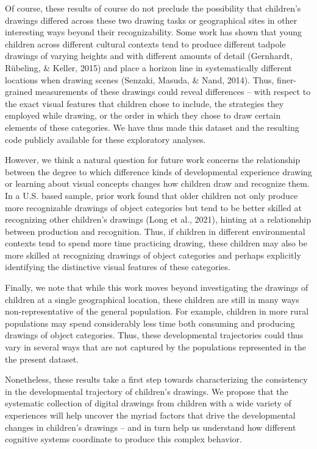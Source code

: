 \documentclass[
  english,
  man]{apa6}
\begin{document}
Of course, these results of course do not preclude the possibility that children's drawings differed across these two drawing tasks or geographical sites in other interesting ways beyond their recognizability. Some work has shown that young children across different cultural contexts tend to produce different tadpole drawings of varying heights and with different amounts of detail (Gernhardt, Rübeling, \& Keller, 2015) and place a horizon line in systematically different locations when drawing scenes (Senzaki, Masuda, \& Nand, 2014). Thus, finer-grained measurements of these drawings could reveal differences -- with respect to the exact visual features that children chose to include, the strategies they employed while drawing, or the order in which they chose to draw certain elements of these categories. We have thus made this dataset and the resulting code publicly available for these exploratory analyses.

However, we think a natural question for future work concerns the relationship between the degree to which difference kinds of developmental experience drawing or learning about visual concepts changes how children draw and recognize them. In a U.S. based sample, prior work found that older children not only produce more recognizable drawings of object categories but tend to be better skilled at recognizing other children's drawings (Long et al., 2021), hinting at a relationship between production and recognition. Thus, if children in different environmental contexts tend to spend more time practicing drawing, these children may also be more skilled at recognizing drawings of object categories and perhaps explicitly identifying the distinctive visual features of these categories.

Finally, we note that while this work moves beyond investigating the drawings of children at a single geographical location, these children are still in many ways non-representative of the general population. For example, children in more rural populations may spend considerably less time both consuming and producing drawings of object categories. Thus, these developmental trajectories could thus vary in several ways that are not captured by the populations represented in the the present dataset.

Nonetheless, these results take a first step towards characterizing the consistency in the developmental trajectory of children's drawings. We propose that the systematic collection of digital drawings from children with a wide variety of experiences will help uncover the myriad factors that drive the developmental changes in children's drawings -- and in turn help us understand how different cognitive systems coordinate to produce this complex behavior.
\end{document}
